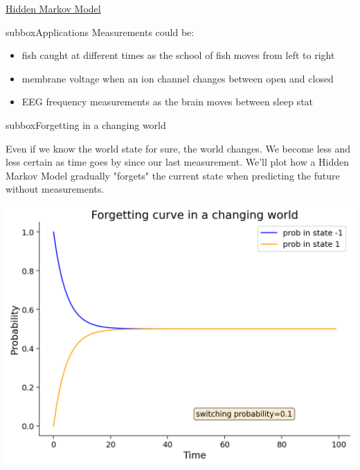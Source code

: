 \begin{textbox}{\href{http://instructor.compneuro.neuromatch.io/tutorials/W3D2_HiddenDynamics/instructor/W3D2_Tutorial2.html}{Hidden Markov Model }   }
\begin{subbox}{subbox}{Applications}
Measurements could be:
\begin{itemize}
    \item 
 fish caught at different times as the school of fish moves from left to right
\item membrane voltage when an ion channel changes between open and closed
\item EEG frequency measurements as the brain moves between sleep stat
\end{itemize}

\end{subbox}
\begin{subbox}{subbox}{Forgetting in a changing world}
\scriptsize



Even if we know the world state for sure, the world changes. We become less and less certain as time goes by since our last measurement. We'll plot how a Hidden Markov Model gradually "forgets" the current state when predicting the future without measurements.
\begin{center}
    
\includegraphics[scale=0.2]{Figures/HD/HD_Figure4.png}
\end{center}
\end{subbox}



\end{textbox}
